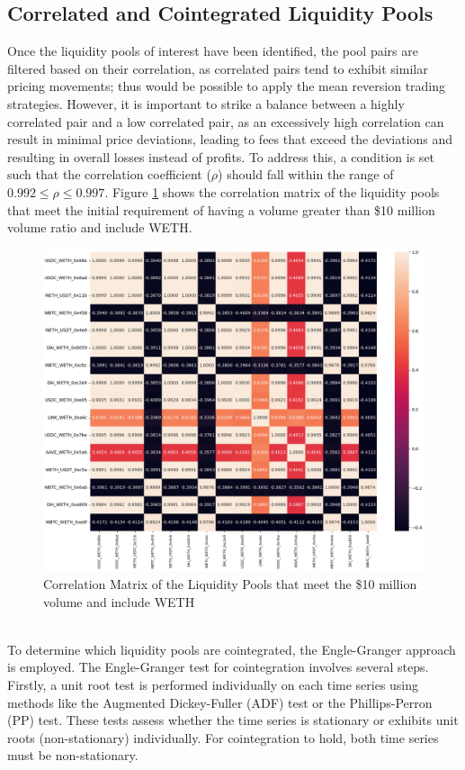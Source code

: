 \subsection{Correlated and Cointegrated Liquidity Pools}
Once the liquidity pools of interest have been identified, the pool pairs are filtered based on their correlation, as correlated pairs tend to exhibit similar pricing movements; thus would be possible to apply the mean reversion trading strategies. However, it is important to strike a balance between a highly correlated pair and a low correlated pair, as an excessively high correlation can result in minimal price deviations, leading to fees that exceed the deviations and resulting in overall losses instead of profits. To address this, a condition is set such that the correlation coefficient ($\rho$) should fall within the range of $0.992 \leq \rho \leq 0.997$. Figure \ref{fig:correlationMatrix} shows the correlation matrix of the liquidity pools that meet the initial requirement of having a volume greater than \$10 million volume ratio and include WETH.
\begin{figure}[!htb]
    \centering
    \includegraphics[width=\textwidth]{project/Images/correlationMatrix.png}
    \caption{Correlation Matrix of the Liquidity Pools that meet the \$10 million volume and include WETH \label{fig:correlationMatrix}}
\end{figure}
\\[3mm]
To determine which liquidity pools are cointegrated, the Engle-Granger approach is employed. The Engle-Granger test for cointegration involves several steps. Firstly, a unit root test is performed individually on each time series using methods like the Augmented Dickey-Fuller (ADF) test or the Phillips-Perron (PP) test. These tests assess whether the time series is stationary or exhibits unit roots (non-stationary) individually. For cointegration to hold, both time series must be non-stationary.
